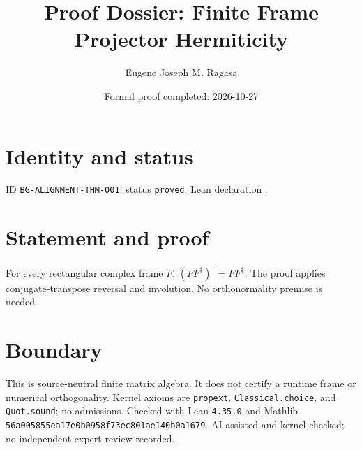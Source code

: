 \documentclass[11pt]{article}
\title{Proof Dossier: Finite Frame Projector Hermiticity}\author{Eugene Joseph M. Ragasa}\date{Formal proof completed: 2026-10-27}
\begin{document}
\maketitle
\section{Identity and status}
ID \texttt{BG-ALIGNMENT-THM-001}; status \texttt{proved}. Lean declaration .
\section{Statement and proof}
For every rectangular complex frame $F$, $(FF^\dagger)^\dagger=FF^\dagger$. The proof applies conjugate-transpose reversal and involution. No orthonormality premise is needed.
\section{Boundary}
This is source-neutral finite matrix algebra. It does not certify a runtime frame or numerical orthogonality. Kernel axioms are \texttt{propext}, \texttt{Classical.choice}, and \texttt{Quot.sound}; no admissions. Checked with Lean \texttt{4.35.0} and Mathlib \texttt{56a005855ea17e0b0958f73ec801ae140b0a1679}. AI-assisted and kernel-checked; no independent expert review recorded.
\end{document}
